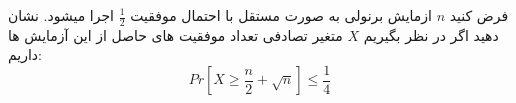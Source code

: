 \problem{}
فرض کنید $n$ ازمایش برنولی به صورت مستقل با احتمال موفقیت $\frac{1}{2}$
اجرا میشود.
نشان دهید اگر در نظر بگیریم $X$ متغیر تصادفی تعداد موفقیت های 
حاصل از این آزمایش ها داریم:\\
\[ Pr[X \geq \frac{n}{2} + \sqrt{n}] \leq \frac{1}{4}\]
